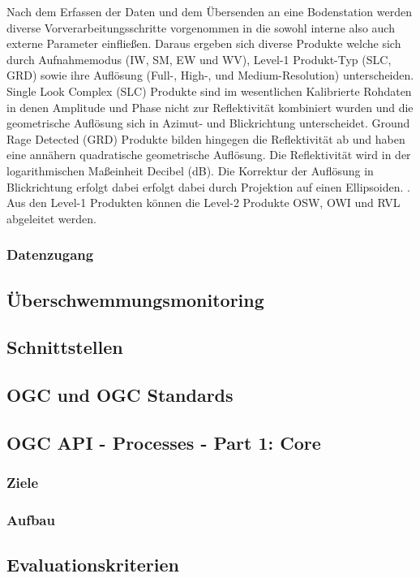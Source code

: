 Nach dem Erfassen der Daten und dem Übersenden an eine Bodenstation werden diverse Vorverarbeitungsschritte vorgenommen in die sowohl interne also auch externe
Parameter einfließen. Daraus ergeben sich diverse Produkte welche sich durch Aufnahmemodus (IW, SM, EW und WV), Level-1 Produkt-Typ (SLC, GRD) sowie ihre 
Auflösung (Full-, High-, und Medium-Resolution) unterscheiden. Single Look Complex (SLC) Produkte sind im wesentlichen Kalibrierte Rohdaten in denen Amplitude und Phase nicht
zur Reflektivität kombiniert wurden und die geometrische Auflösung sich in Azimut- und Blickrichtung unterscheidet. Ground Rage Detected (GRD) Produkte bilden hingegen die 
Reflektivität ab und haben eine annähern quadratische geometrische Auflösung. Die Reflektivität wird in der logarithmischen Maßeinheit Decibel (dB). Die Korrektur der Auflösung 
in Blickrichtung erfolgt dabei erfolgt dabei durch Projektion auf einen Ellipsoiden. \cite{sentinel_1_definition}. Aus den Level-1 Produkten können die Level-2 Produkte 
OSW, OWI und RVL abgeleitet werden.

\subsubsection{Datenzugang}
\subsection{Überschwemmungsmonitoring}
\subsection{Schnittstellen}
\subsection{OGC und OGC Standards}
\subsection{OGC API - Processes - Part 1: Core}
\subsubsection{Ziele}
\subsubsection{Aufbau}
\subsection{Evaluationskriterien}

